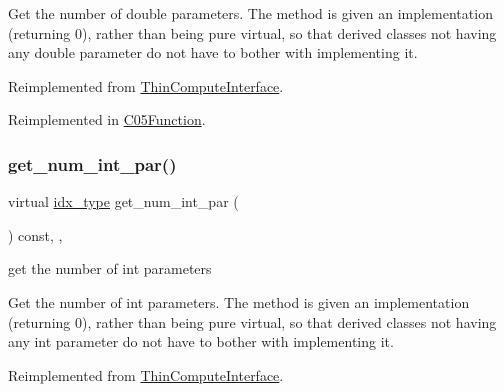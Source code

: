 Get the number of double parameters. The method is given an implementation (returning 0), rather than being pure virtual, so that derived classes not having any double parameter do not have to bother with implementing it. 

Reimplemented from \mbox{\hyperlink{class_s_m_spp__di__unipi__it_1_1_thin_compute_interface_a03d2492bc7caa7e7821fa1bc4f06a36e}{Thin\+Compute\+Interface}}.



Reimplemented in \mbox{\hyperlink{class_s_m_spp__di__unipi__it_1_1_c05_function_a842fd454acaded84baf6b77e0d61a950}{C05\+Function}}.

\mbox{\label{class_s_m_spp__di__unipi__it_1_1_function_a3ad74d9506761eb2ca4c8a936fb7a1c5}} 
\subsubsection{\texorpdfstring{get\+\_\+num\+\_\+int\+\_\+par()}{get\_num\_int\_par()}}
{\footnotesize\ttfamily virtual \mbox{\hyperlink{class_s_m_spp__di__unipi__it_1_1_thin_compute_interface_aa3d710629ad8c434286726ad810c3b47}{idx\+\_\+type}} get\+\_\+num\+\_\+int\+\_\+par (\begin{DoxyParamCaption}\item[{void}]{ }\end{DoxyParamCaption}) const\hspace{0.3cm}{\ttfamily [inline]}, {\ttfamily [override]}, {\ttfamily [virtual]}}



get the number of int parameters 

Get the number of int parameters. The method is given an implementation (returning 0), rather than being pure virtual, so that derived classes not having any int parameter do not have to bother with implementing it. 

Reimplemented from \mbox{\hyperlink{class_s_m_spp__di__unipi__it_1_1_thin_compute_interface_a1e009f6b43f7966bf4b4740e0b4cff58}{Thin\+Compute\+Interface}}.



